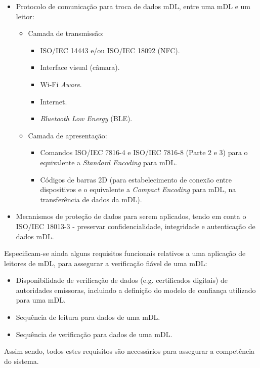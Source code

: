 \begin{itemize}
	\item Protocolo de comunicação para troca de dados mDL, entre uma mDL e um leitor:
	\begin{itemize}
		\item Camada de transmissão:
		\begin{itemize}
			\item ISO/IEC 14443 e/ou ISO/IEC 18092 (NFC).
			\item Interface visual (câmara).
			\item Wi-Fi \textit{Aware}.
			\item Internet.
			\item \textit{Bluetooth Low Energy} (BLE).
		\end{itemize}
		\item Camada de apresentação:
		\begin{itemize}
			\item Comandos ISO/IEC 7816-4 e ISO/IEC 7816-8 (Parte 2 e 3) para o equivalente a \textit{Standard Encoding} para mDL.
			\item Códigos de barras 2D (para estabelecimento de conexão entre dispositivos e o equivalente a \textit{Compact Encoding} para mDL, na transferência de dados da mDL).
		\end{itemize}
	\end{itemize}

	\item Mecanismos de proteção de dados para serem aplicados, tendo em conta o ISO/IEC 18013-3 - preservar confidencialidade, integridade e autenticação de dados mDL.
\end{itemize}

Especificam-se ainda alguns requisitos funcionais relativos a uma aplicação de leitores de mDL, para assegurar a verificação fiável de uma mDL:

\begin{itemize}
	\item Disponibilidade de verificação de dados (e.g. certificados digitais) de autoridades emissoras, incluindo a definição do modelo de confiança utilizado para uma mDL.
	\item Sequência de leitura para dados de uma mDL.
	\item Sequência de verificação para dados de uma mDL.
\end{itemize}

Assim sendo, todos estes requisitos são necessários para assegurar a competência do sistema.
